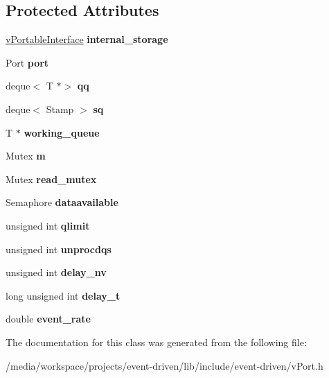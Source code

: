 \subsection*{Protected Attributes}
\begin{DoxyCompactItemize}
\item 
\mbox{\label{classev_1_1vReadPort_a7d2052a556597fb452648acfc9c69c7c}} 
\hyperlink{classev_1_1vPortableInterface}{v\+Portable\+Interface} {\bfseries internal\+\_\+storage}
\item 
\mbox{\label{classev_1_1vReadPort_af7dc70719d3d3b747410cac249375cd1}} 
Port {\bfseries port}
\item 
\mbox{\label{classev_1_1vReadPort_a0a644757f74909b9ffc65cdf573c62a9}} 
deque$<$ T $\ast$$>$ {\bfseries qq}
\item 
\mbox{\label{classev_1_1vReadPort_a1f90047aed50cbf8b76e0b75e2330eb1}} 
deque$<$ Stamp $>$ {\bfseries sq}
\item 
\mbox{\label{classev_1_1vReadPort_a16253ae31557093d1678bcf7b9907208}} 
T $\ast$ {\bfseries working\+\_\+queue}
\item 
\mbox{\label{classev_1_1vReadPort_a35bb3489d3fa7fe86c0ef7b563305976}} 
Mutex {\bfseries m}
\item 
\mbox{\label{classev_1_1vReadPort_a1481febbd2f80b1874090aea1365e9dd}} 
Mutex {\bfseries read\+\_\+mutex}
\item 
\mbox{\label{classev_1_1vReadPort_afbcd0f47ccdafcedc57a2f23d104a145}} 
Semaphore {\bfseries dataavailable}
\item 
\mbox{\label{classev_1_1vReadPort_a35f6fe719860861eaaf9b2ebc30ac99e}} 
unsigned int {\bfseries qlimit}
\item 
\mbox{\label{classev_1_1vReadPort_acdcf63464771194e87d0fdd8226361a0}} 
unsigned int {\bfseries unprocdqs}
\item 
\mbox{\label{classev_1_1vReadPort_af6ce0d204c3fc755b32a31cdcc3b55b0}} 
unsigned int {\bfseries delay\+\_\+nv}
\item 
\mbox{\label{classev_1_1vReadPort_a440488d899ba95a07ec610616ffc9cd2}} 
long unsigned int {\bfseries delay\+\_\+t}
\item 
\mbox{\label{classev_1_1vReadPort_a9888128c255eaf3cc2d528590b8bf12f}} 
double {\bfseries event\+\_\+rate}
\end{DoxyCompactItemize}


The documentation for this class was generated from the following file\+:\begin{DoxyCompactItemize}
\item 
/media/workspace/projects/event-\/driven/lib/include/event-\/driven/v\+Port.\+h\end{DoxyCompactItemize}
